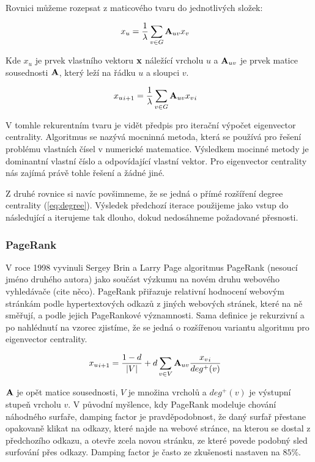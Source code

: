 \documentclass[12pt,titlepage]{report}
\begin{document}
Rovnici můžeme rozepsat z maticového tvaru do jednotlivých složek:

\begin{align} 
x_u &=  \frac{1}{\lambda} \displaystyle\sum_{v \in G} {\bf A}_{uv} x_v 
\end{align} 

Kde $x_u$ je prvek vlastního vektoru ${\bf x}$
náležící vrcholu $u$ a ${\bf A}_{uv}$ je prvek matice sousednosti ${\bf A}$,
který leží na řádku $u$ a sloupci $v$.

\begin{align} 
{x_u}_{i + 1} &=  \frac{1}{\lambda} \displaystyle\sum_{v \in G} {\bf A}_{uv}
{x_v}_{i}
\end{align} 

V tomhle rekurentním tvaru je vidět předpis pro iterační výpočet eigenvector
centrality. Algoritmus se nazývá mocninná metoda, která se používá pro řešení
problému vlastních čísel v numerické matematice. Výsledkem mocinné metody je
dominantní vlastní číslo a odpovídající vlastní vektor. Pro eigenvector
centrality nás zajímá právě tohle řešení a žádné jiné.

Z druhé rovnice si navíc povšimneme, že se jedná o přímé rozšíření degree
centrality (\ref{eq:degree}). Výsledek předchozí iterace použijeme jako vstup
do následující a iterujeme tak dlouho, dokud nedosáhneme požadované přesnosti.

\subsubsection{PageRank}
V roce 1998 vyvinuli Sergey Brin a Larry Page algoritmus PageRank (nesoucí
jméno druhého autora) jako součást výzkumu na novém druhu webového vyhledávače
(cite něco). PageRank přiřazuje relativní hodnocení webovým stránkám podle
hypertextových odkazů z jiných webových stránek, které na ně směřují, a podle
jejich PageRankové významnosti. Sama definice je rekurzivní a po nahlédnutí na
vzorec zjistíme, že se jedná o rozšířenou variantu algoritmu pro eigenvector
centrality.

\begin{align}
{x_u}_{i + 1} &= \frac{1 - d}{|V|} + d \displaystyle\sum_{v \in V} {\bf A}_{uv}
\frac{{x_v}_{i}}{deg^+ (v)}
\end{align}

${\bf A}$ je opět matice sousednosti, $V$ je množina vrcholů a $deg^+(v)$ je
výstupní stupeň vrcholu $v$.  V původní myšlence, kdy PageRank modeluje chování
náhodného surfaře, damping factor je pravděpodobnost, že daný surfař přestane
opakovaně klikat na odkazy, které najde na webové stránce, na kterou se dostal
z předchozího odkazu, a otevře zcela novou stránku, ze které povede podobný
sled surfování přes odkazy.  Damping factor je často ze zkušenosti nastaven na
$85\%$.
\end{document}
